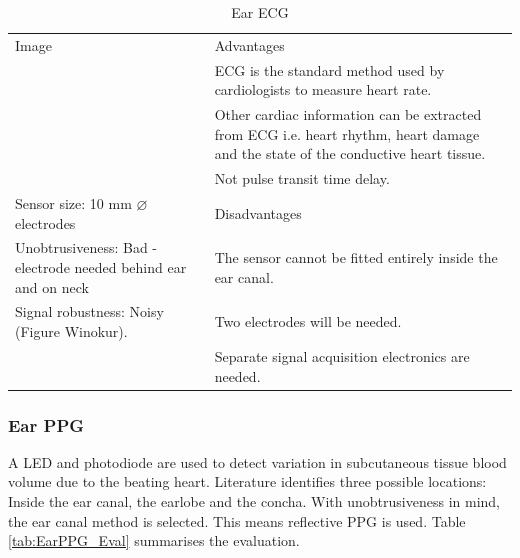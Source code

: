 \begin{table}[H]
\caption{Ear ECG}
\label{tab:EarECG_Eval}
\renewcommand{\arraystretch}{1.3}	%
\centering
\begin{tabular}{|p{5cm}|p{8cm}|} 
 \hline
 Image 						& 	Advantages  \\ 
  							&	\tabitem ECG is the standard method used by cardiologists to measure heart rate.\\
  							&	\tabitem Other cardiac information can be extracted from ECG i.e. heart rhythm, heart damage and the state of the conductive heart tissue.\\
  							&	\tabitem Not pulse transit time delay.\\
\hline
Sensor size: 10 mm  ${\diameter}$ electrodes					&	Disadvantages  \\ 
Unobtrusiveness: Bad - electrode needed behind ear and on neck 	&	\tabitem The sensor cannot be fitted entirely inside the ear canal.\\
Signal robustness: Noisy (Figure Winokur). 						&	\tabitem Two electrodes will be needed.\\
  																&	\tabitem Separate signal acquisition electronics are needed.\\
 
 \hline
\end{tabular}
\end{table}

\subsubsection{Ear PPG}
A LED and photodiode are used to detect variation in subcutaneous tissue blood volume due to the beating heart. Literature identifies three possible locations: Inside the ear canal, the earlobe and the concha. With unobtrusiveness in mind, the ear canal method is selected. This means reflective PPG is used. Table \ref{tab:EarPPG_Eval} summarises the evaluation.

